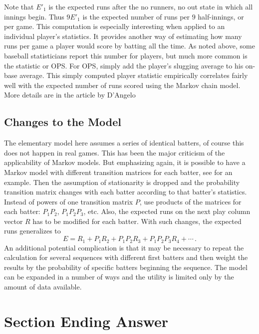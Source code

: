\documentclass[12pt]{article}
\begin{document}
Note that \( E'_1 \) is the expected runs after the no runners, no out
state in which all innings begin.  Thus  \(
9E'_1 \) is the expected number of runs per \( 9 \) half-innings, or per
game. This computation is especially interesting when applied to an
individual player's statistics.  It provides another way of estimating
how many runs per game a player would score by batting all the time.  As
noted above, some baseball statisticians report this number for players,
but much more common is the  statistic or
OPS\@. For OPS, simply add the player's slugging average to his on-base
average.  This simply computed player statistic empirically correlates
fairly well with the expected number of runs scored using the Markov
chain model.  More details are in the article by D'Angelo
\cite{dangelo10}

\subsection*{Changes to the Model} The elementary model here assumes a
series of identical batters, of course this does not happen in real
games.  This has been the major criticism of the applicability of Markov
models.  But emphasizing again, it is possible to have a Markov model
with different transition matrices for each batter, see
\cite{osbourne20} for an example. Then the assumption of stationarity is
dropped and the probability transition matrix changes with each batter
according to that batter's statistics.  Instead of powers of one
transition matrix \( P \), use products of the matrices for each batter:
\( P_1 P_2 \), \( P_1 P_2 P_3 \), etc.  Also, the expected runs on the
next play column vector \( R \) has to be modified for each batter.
With such changes, the expected runs generalizes to
\[
    E = R_{1} + P_1 R_2 + P_1 P_2 R_3 + P_1 P_2 P_3 R_4 + \cdots\,.
\] An additional potential complication is that it may be necessary to
repeat the calculation for several sequences with different first
batters and then weight the results by the probability of specific
batters beginning the sequence.  The model can be expanded in a number
of ways and the utility is limited only by the amount of data available.

\section*{Section Ending Answer}
\end{document}
